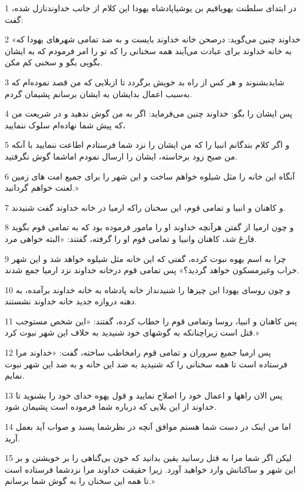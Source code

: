 \par 1 در ابتدای سلطنت یهویاقیم بن یوشیاپادشاه یهودا این کلام از جانب خداوندنازل شده، گفت:
\par 2 «خداوند چنین می‌گوید: درصحن خانه خداوند بایست و به ضد تمامی شهرهای یهودا که به خانه خداوند برای عبادت می‌آیند همه سخنانی را که تو را امر فرمودم که به ایشان بگویی بگو و سخنی کم مکن.
\par 3 شایدبشنوند و هر کس از راه بد خویش برگردد تا ازبلایی که من قصد نموده‌ام که به‌سبب اعمال بدایشان به ایشان برسانم پشیمان گردم.
\par 4 پس ایشان را بگو: خداوند چنین می‌فرماید: اگر به من گوش ندهید و در شریعت من که پیش شما نهاده‌ام سلوک ننمایید،
\par 5 و اگر کلام بندگانم انبیا را که من ایشان را نزد شما فرستادم اطاعت ننمایید با آنکه من صبح زود برخاسته، ایشان را ارسال نمودم اماشما گوش نگرفتید.
\par 6 آنگاه این خانه را مثل شیلوه خواهم ساخت و این شهر را برای جمیع امت های زمین لعنت خواهم گردانید.»
\par 7 و کاهنان و انبیا و تمامی قوم، این سخنان راکه ارمیا در خانه خداوند گفت شنیدند.
\par 8 و چون ارمیا از گفتن هر‌آنچه خداوند او را مامور فرموده بود که به تمامی قوم بگوید فارغ شد، کاهنان وانبیا و تمامی قوم او را گرفته، گفتند: «البته خواهی مرد.
\par 9 چرا به اسم یهوه نبوت کرده، گفتی که این خانه مثل شیلوه خواهد شد و این شهر خراب وغیرمسکون خواهد گردید؟» پس تمامی قوم درخانه خداوند نزد ارمیا جمع شدند.
\par 10 و چون روسای یهودا این چیزها را شنیدنداز خانه پادشاه به خانه خداوند برآمده، به دهنه دروازه جدید خانه خداوند نشستند.
\par 11 پس کاهنان و انبیا، روسا وتمامی قوم را خطاب کرده، گفتند: «این شخص مستوجب قتل است زیراچنانکه به گوشهای خود شنیدید به خلاف این شهر نبوت کرد.»
\par 12 پس ارمیا جمیع سروران و تمامی قوم رامخاطب ساخته، گفت: «خداوند مرا فرستاده است تا همه سخنانی را که شنیدید به ضد این خانه و به ضد این شهر نبوت نمایم.
\par 13 پس الان راهها و اعمال خود را اصلاح نمایید و قول یهوه خدای خود را بشنوید تا خداوند از این بلایی که درباره شما فرموده است پشیمان شود.
\par 14 اما من اینک در دست شما هستم موافق آنچه در نظرشما پسند و صواب آید بعمل آرید.
\par 15 لیکن اگر شما مرا به قتل رسانید یقین بدانید که خون بی‌گناهی را بر خویشتن و بر این شهر و ساکنانش وارد خواهید آورد. زیرا حقیقت خداوند مرا نزدشما فرستاده است تا همه این سخنان را به گوش شما برسانم.»
